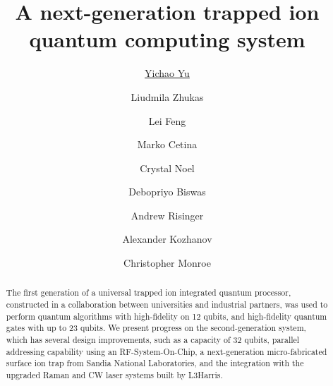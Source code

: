 \documentclass[superscriptaddress]{revtex4-2}
\begin{document}

\title{A next-generation trapped ion quantum computing system}

\author{\underline{Yichao Yu}} %
\author{Liudmila Zhukas}
\author{Lei Feng}
\author{Marko Cetina}
\author{Crystal Noel}
\author{Debopriyo Biswas}
\author{Andrew Risinger}
\author{Alexander Kozhanov}
\author{Christopher Monroe}

\begin{abstract}
  The first generation of a universal trapped ion integrated quantum processor, constructed in a collaboration between universities and industrial partners, was used to perform quantum algorithms with high-fidelity on 12 qubits, and high-fidelity quantum gates with up to 23 qubits. We present progress on the second-generation system, which has several design improvements, such as a capacity of 32 qubits, parallel addressing capability using an RF-System-On-Chip, a next-generation micro-fabricated surface ion trap from Sandia National Laboratories, and the integration with the upgraded Raman and CW laser systems built by L3Harris.
\end{abstract}

\maketitle
\end{document}
